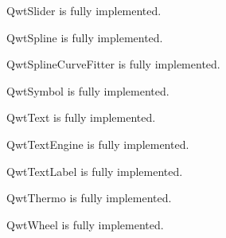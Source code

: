 \documentclass{manual}
\begin{document}
\begin{classdesc*}{QwtSlider}
  is fully implemented.
\end{classdesc*}

\begin{classdesc*}{QwtSpline}
  is fully implemented.
\end{classdesc*}

\begin{classdesc*}{QwtSplineCurveFitter}
  is fully implemented.
\end{classdesc*}
 
\begin{classdesc*}{QwtSymbol}
  is fully implemented.
\end{classdesc*}

\begin{classdesc*}{QwtText}
  is fully implemented.
\end{classdesc*}

\begin{classdesc*}{QwtTextEngine}
  is fully implemented.
\end{classdesc*}

\begin{classdesc*}{QwtTextLabel}
  is fully implemented.
\end{classdesc*}

\begin{classdesc*}{QwtThermo}
  is fully implemented.
\end{classdesc*}

\begin{classdesc*}{QwtWheel}
  is fully implemented.
\end{classdesc*}


\end{document}
